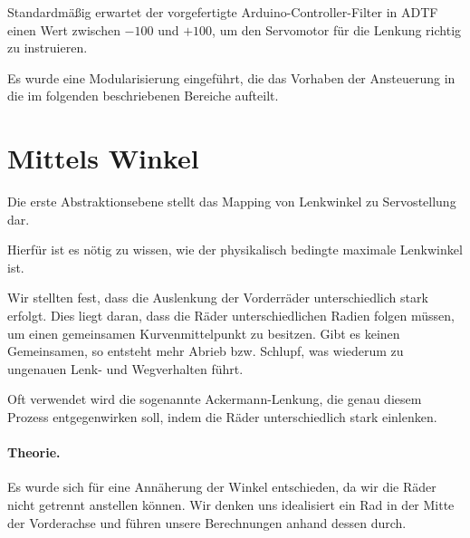 \documentclass[a4paper,12pt]{report}
\begin{document}
	Standardmäßig erwartet der vorgefertigte Arduino-Controller-Filter in ADTF einen Wert zwischen $-100$ und $+100$, um den Servomotor für die Lenkung richtig zu instruieren.
	
	Es wurde eine Modularisierung eingeführt, die das Vorhaben der Ansteuerung in die im folgenden beschriebenen Bereiche aufteilt.
	
\section{Mittels Winkel}
\label{Steering_Angle_To_Servo}

	Die erste Abstraktionsebene stellt das Mapping von Lenkwinkel zu Servostellung dar.
	
	Hierfür ist es nötig zu wissen, wie der physikalisch bedingte maximale Lenkwinkel ist.
	
	Wir stellten fest, dass die Auslenkung der Vorderräder unterschiedlich stark erfolgt.
	Dies liegt daran, dass die Räder unterschiedlichen Radien folgen müssen, um einen gemeinsamen Kurvenmittelpunkt zu besitzen.
	Gibt es keinen Gemeinsamen, so entsteht mehr Abrieb bzw. Schlupf, was wiederum zu ungenauen Lenk- und Wegverhalten führt.
	
	Oft verwendet wird die sogenannte Ackermann-Lenkung, die genau diesem Prozess entgegenwirken soll, indem die Räder unterschiedlich stark einlenken.
	
	\paragraph{Theorie.}
	Es wurde sich für eine Annäherung der Winkel entschieden, da wir die Räder nicht getrennt anstellen können.
	Wir denken uns idealisiert ein Rad in der Mitte der Vorderachse und führen unsere Berechnungen anhand dessen durch.
	
\end{document}
